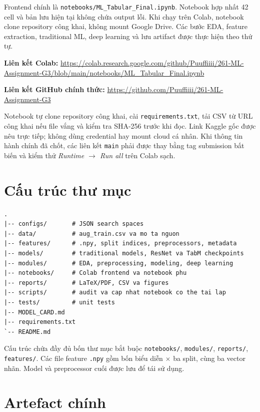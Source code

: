 \documentclass[12pt,a4paper,oneside]{report}
\newcommand{\code}[1]{\texttt{#1}}
\begin{document}
Frontend chính là \code{notebooks/ML\_Tabular\_Final.ipynb}. Notebook hợp nhất 42 cell và bản lưu hiện tại không chứa output lỗi. Khi chạy trên Colab, notebook clone repository công khai, không mount Google Drive. Các bước EDA, feature extraction, traditional ML, deep learning và lưu artifact được thực hiện theo thứ tự.

\noindent\textbf{Liên kết Colab:} \url{https://colab.research.google.com/github/Puuffiiii/261-ML-Assignment-G3/blob/main/notebooks/ML_Tabular_Final.ipynb}

\noindent\textbf{Liên kết GitHub chính thức:} \url{https://github.com/Puuffiiii/261-ML-Assignment-G3}

\medskip
Notebook tự clone repository công khai, cài \code{requirements.txt}, tải CSV từ URL công khai nếu file vắng và kiểm tra SHA-256 trước khi đọc. Link Kaggle gốc được nêu trực tiếp; không dùng credential hay mount cloud cá nhân. Khi thông tin hành chính đã chốt, các liên kết \code{main} phải được thay bằng tag submission bất biến và kiểm thử \textit{Runtime $\rightarrow$ Run all} trên Colab sạch.

\section{Cấu trúc thư mục}

\begin{lstlisting}
.
|-- configs/       # JSON search spaces
|-- data/          # aug_train.csv va mo ta nguon
|-- features/      # .npy, split indices, preprocessors, metadata
|-- models/        # traditional models, ResNet va TabM checkpoints
|-- modules/       # EDA, preprocessing, modeling, deep learning
|-- notebooks/     # Colab frontend va notebook phu
|-- reports/       # LaTeX/PDF, CSV va figures
|-- scripts/       # audit va cap nhat notebook co the tai lap
|-- tests/         # unit tests
|-- MODEL_CARD.md
|-- requirements.txt
`-- README.md
\end{lstlisting}

Cấu trúc chứa đầy đủ bốn thư mục bắt buộc \code{notebooks/}, \code{modules/}, \code{reports/}, \code{features/}. Các file feature \code{.npy} gồm bốn biểu diễn $\times$ ba split, cùng ba vector nhãn. Model và preprocessor cuối được lưu để tái sử dụng.

\section{Artefact chính}
\end{document}
